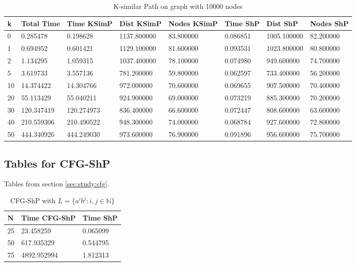 \documentclass[]{article}
\numberwithin{equation}{section}
\begin{document}
\begin{appendices}
\begin{table}[H]
	\centering
	\small
	\setlength\tabcolsep{2pt}
	\begin{tabular}{|l|l|l|l|l|l|l|l|}
		\hline
		k  & Total Time & Time KSimP & Dist KSimP  & Nodes KSimP & Time ShP & Dist ShP    & Nodes ShP \\ \hline
		0  & 0.285478   & 0.198628   & 1137.800000 & 83.800000   & 0.086851 & 1005.100000 & 82.200000 \\ \hline
		1  & 0.694952   & 0.601421   & 1129.100000 & 81.600000   & 0.093531 & 1023.800000 & 80.800000 \\ \hline
		2  & 1.134295   & 1.059315   & 1037.400000 & 78.100000   & 0.074980 & 949.600000  & 74.700000 \\ \hline
		5  & 3.619733   & 3.557136   & 781.200000  & 59.800000   & 0.062597 & 733.400000  & 56.200000 \\ \hline
		10 & 14.374422  & 14.304766  & 972.000000  & 70.600000   & 0.069655 & 907.500000  & 70.400000 \\ \hline
		20 & 55.113429  & 55.040211  & 924.900000  & 69.000000   & 0.073219 & 885.300000  & 70.200000 \\ \hline
		30 & 120.347419 & 120.274973 & 836.400000  & 66.600000   & 0.072447 & 808.600000  & 63.600000 \\ \hline
		40 & 210.559306 & 210.490522 & 948.300000  & 74.000000   & 0.068784 & 927.600000  & 72.800000 \\ \hline
		50 & 444.340926 & 444.249030 & 973.600000  & 76.900000   & 0.091896 & 956.600000  & 75.700000 \\ \hline
	\end{tabular}
	\caption{K-similar Path on graph with 10000 nodes}
\end{table}

\subsection{Tables for CFG-ShP}
\label{app:tables:cfg}

Tables from section \ref{sec:study:cfg}.\\

\begin{table}[H]
	\centering
	\small
	\setlength\tabcolsep{2pt}
	\begin{tabular}{|l|l|l|}
		\hline
		N  & Time CFG-ShP & Time ShP \\ \hline
		25 & 23.458259    & 0.065099 \\ \hline
		50 & 617.935329   & 0.544795 \\ \hline
		75 & 4892.952994  & 1.812313 \\ \hline
	\end{tabular}
	\caption{CFG-ShP with $L = \{a^ib^j:i,j\in\mathbb{N}\}$}
\end{table}


\end{appendices}
\end{document}
